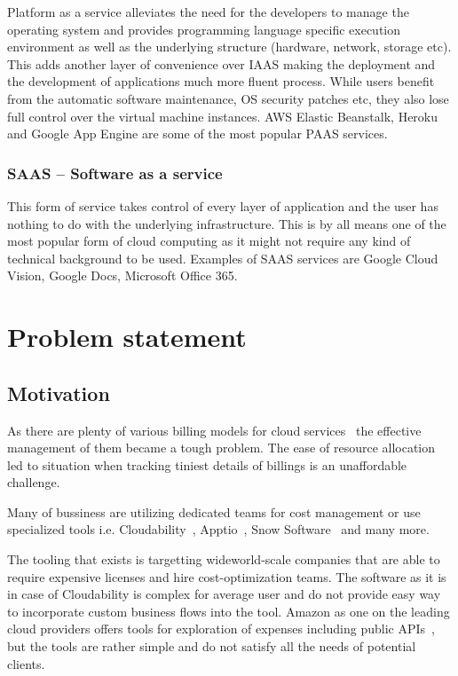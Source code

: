 \documentclass[licencjacka,en]{thesisclass}
\begin{document}
        Platform as a service alleviates the need for the developers to manage the operating system and
        provides programming language specific execution environment as well as the underlying structure
        (hardware, network, storage etc). This adds another layer of convenience over IAAS making the deployment
        and the development of applications much more fluent process. While users benefit from the automatic software maintenance,
        OS security patches etc, they also lose full control over the virtual machine instances. AWS Elastic Beanstalk, Heroku
        and Google App Engine are some of the most popular PAAS services.

        \subsection{SAAS -- Software as a service}

        This form of service takes control of every layer of application and the user has nothing to do with
        the underlying infrastructure. This is by all means one of the most popular form of cloud computing as
        it might not require any kind of technical background to be used. Examples of SAAS services are Google
        Cloud Vision, Google Docs, Microsoft Office 365. 

\chapter{Problem statement}

    \section{Motivation}

        As there are plenty of various billing models for cloud services~\cite{GLaatikainen}
        the effective management of them became a tough problem.
        The ease of resource allocation led to situation when tracking tiniest details of billings is an unaffordable challenge.

        Many of bussiness are utilizing dedicated teams for cost management or use specialized tools i.e.
        Cloudability~\cite{Cloudability}, Apptio~\cite{Apptio}, Snow Software~\cite{SnowSoftware} and many more.

        The tooling that exists is targetting wideworld-scale companies that are able to require expensive licenses and hire cost-optimization teams.
        The software as it is in case of Cloudability is complex for average user and do not provide easy way to incorporate custom business flows into the tool.
        Amazon as one on the leading cloud providers offers tools for exploration of expenses including public APIs~\cite{AWSCostManagement},
        but the tools are rather simple and do not satisfy all the needs of potential clients.
\end{document}
